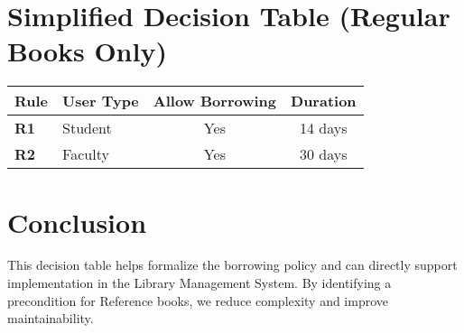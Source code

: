 \documentclass[12pt]{article}
\begin{document}
\section{Simplified Decision Table (Regular Books Only)}

\begin{center}
\begin{tabular}{>{\bfseries}l l c c}
\toprule
Rule & User Type & Allow Borrowing & Duration \\
\midrule
R1 & Student & Yes & 14 days \\
R2 & Faculty & Yes & 30 days \\
\bottomrule
\end{tabular}
\end{center}

\section{Conclusion}

This decision table helps formalize the borrowing policy and can directly support implementation in the Library Management System. By identifying a precondition for Reference books, we reduce complexity and improve maintainability.
\end{document}
